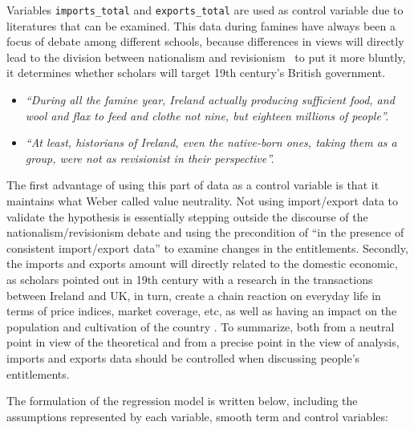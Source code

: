 Variables \texttt{imports\_total} and \texttt{exports\_total} are used as control variable due to literatures that can be examined. This data during famines have always been a focus of debate among different schools, because differences in views will directly lead to the division between nationalism and revisionism \textemdash\ to put it more bluntly, it determines whether scholars will target 19th century's British government. 

\begin{itemize}
    \item [] \textit{``During all the famine year, Ireland actually producing sufficient food, and wool and flax to feed and clothe not nine, but eighteen millions of people''.} \citep{mitchel1905apology}
    \item [] \textit{``At least, historians of Ireland, even the native-born ones, taking them as a group, were not as revisionist in their perspective''.}\citep{donnelly1996construction}
\end{itemize}

The first advantage of using this part of data as a control variable is that it maintains what Weber called value neutrality. Not using import/export data to validate the hypothesis is essentially stepping outside the discourse of the nationalism/revisionism debate and using the precondition of ``in the presence of consistent import/export data'' to examine changes in the entitlements. Secondly, the imports and exports amount will directly related to the domestic economic, as scholars \citep{hansard1840flour} pointed out in 19th century with a research in the transactions between Ireland and UK, in turn, create a chain reaction on everyday life in terms of price indices, market coverage, etc, as well as having an impact on the population and cultivation of the country \citep{solar2015ireland}. To summarize, both from a neutral point in view of the theoretical and from a precise point in the view of analysis, imports and exports data should be controlled when discussing people's entitlements.

The formulation of the regression model is written below, including the assumptions represented by each variable, smooth term and control variables:

